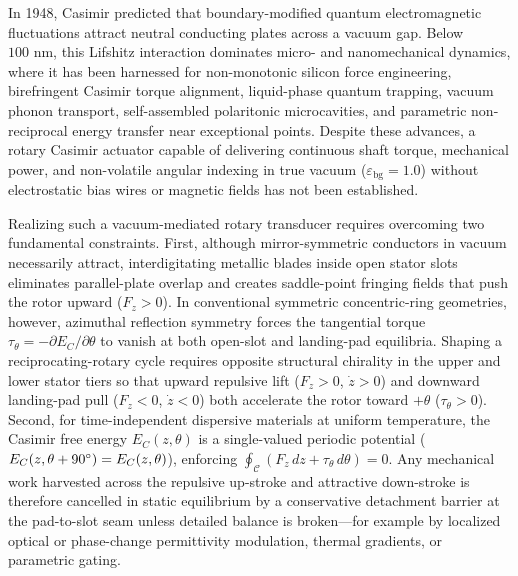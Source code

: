 \documentclass[11pt,a4paper]{article}
\begin{document}
In 1948, Casimir predicted that boundary-modified quantum electromagnetic fluctuations attract neutral conducting plates across a vacuum gap\cite{casimir1948,bordag2009}. Below $100\text{ nm}$, this Lifshitz interaction\cite{lifshitz1956,woods2016} dominates micro- and nanomechanical dynamics\cite{chan2001,rodriguez2011}, where it has been harnessed for non-monotonic silicon force engineering\cite{tang2017}, birefringent Casimir torque alignment\cite{somers2018}, liquid-phase quantum trapping\cite{munday2009,zhao2019}, vacuum phonon transport\cite{fong2019}, self-assembled polaritonic microcavities\cite{munkhbat2021}, and parametric non-reciprocal energy transfer near exceptional points\cite{xu2022natnano}. Despite these advances, a rotary Casimir actuator capable of delivering continuous shaft torque, mechanical power, and non-volatile angular indexing in true vacuum ($\varepsilon_{\mathrm{bg}}=1.0$) without electrostatic bias wires or magnetic fields has not been established.

Realizing such a vacuum-mediated rotary transducer requires overcoming two fundamental constraints. First, although mirror-symmetric conductors in vacuum necessarily attract\cite{kennethklich2006}, interdigitating metallic blades inside open stator slots eliminates parallel-plate overlap and creates saddle-point fringing fields that push the rotor upward ($F_z > 0$)\cite{levin2010}. In conventional symmetric concentric-ring geometries\cite{shajesh2017}, however, azimuthal reflection symmetry forces the tangential torque $\tau_\theta = -\partial E_C/\partial\theta$ to vanish at both open-slot and landing-pad equilibria. Shaping a reciprocating-rotary cycle requires opposite structural chirality in the upper and lower stator tiers so that upward repulsive lift ($F_z > 0$, $\dot{z} > 0$) and downward landing-pad pull ($F_z < 0$, $\dot{z} < 0$) both accelerate the rotor toward $+\theta$ ($\tau_\theta > 0$). Second, for time-independent dispersive materials at uniform temperature, the Casimir free energy $E_C(z,\theta)$ is a single-valued periodic potential ($E_C(z,\theta+90{}^\circ)=E_C(z,\theta)$), enforcing $\oint_{\mathcal{C}}(F_z\,dz + \tau_\theta\,d\theta)=0$. Any mechanical work harvested across the repulsive up-stroke and attractive down-stroke is therefore cancelled in static equilibrium by a conservative detachment barrier at the pad-to-slot seam unless detailed balance is broken—for example by localized optical or phase-change permittivity modulation\cite{chen2007light,qazilbash2007,torricelli2010pcm}, thermal gradients\cite{antizza2008}, or parametric gating.
\end{document}
